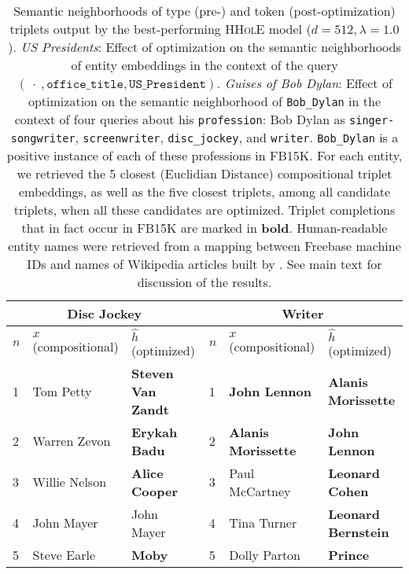 \documentclass[a4paper,10pt]{article}
\begin{document}
\begin{table*}
\begin{tabular}{lll | lll}
 \\
 \multicolumn{3}{c}{\small \textbf{Disc Jockey} } & \multicolumn{3}{c}{\small \textbf{Writer} }  \\ \hline
 \multicolumn{1}{l}{\small $n$} & \multicolumn{1}{l}{\small \textbf{$x$} (compositional)} & \multicolumn{1}{l|}{\small \textbf{$\hat{h}$} (optimized)} & \multicolumn{1}{l}{\small $n$} & \multicolumn{1}{l}{\small \textbf{$x$} (compositional)} & \multicolumn{1}{l}{\small \textbf{$\hat{h}$} (optimized)} \\ \hline 
 {\scriptsize 1 } & { \scriptsize Tom Petty} & { \scriptsize \textbf{Steven Van Zandt} } &  {\scriptsize 1 } & { \scriptsize \textbf{John Lennon} } & { \scriptsize \textbf{Alanis Morissette} } \\
 {\scriptsize 2 } & { \scriptsize Warren Zevon } & { \scriptsize \textbf{Erykah Badu} }&  {\scriptsize 2 } & { \scriptsize \textbf{Alanis Morissette} } & { \scriptsize \textbf{John Lennon}}\\ 
 {\scriptsize 3 } & { \scriptsize Willie Nelson } & { \scriptsize \textbf{Alice Cooper} } &  {\scriptsize 3 } & { \scriptsize Paul McCartney } & { \scriptsize \textbf{Leonard Cohen} }\\ 
 {\scriptsize 4 } & { \scriptsize John Mayer } & { \scriptsize John Mayer} &  {\scriptsize 4 } & { \scriptsize Tina Turner } & { \scriptsize \textbf{Leonard Bernstein}}\\ 
 {\scriptsize 5 } & { \scriptsize Steve Earle } & { \scriptsize \textbf{Moby} } &  {\scriptsize 5 } & { \scriptsize Dolly Parton } & { \scriptsize \textbf{Prince} }\\ \hline  
 \end{tabular} 
 \caption{Semantic neighborhoods of type (pre-) and token (post-optimization) triplets output by the best-performing \textsc{HHolE} model ($d = 512, \lambda = 1.0$). \emph{US Presidents}: Effect of optimization on the semantic neighborhoods of entity embeddings in the context of the query $(\ \cdot\ , \mathtt{office\_title}, \mathtt{US\_{}President})$. \emph{Guises of Bob Dylan}: Effect of optimization on the semantic neighborhood of \texttt{Bob\_{}Dylan} in the context of four queries about his \texttt{profession}: Bob Dylan as \texttt{singer-songwriter}, \texttt{screenwriter}, \texttt{disc\_{}jockey}, and \texttt{writer}. \texttt{Bob\_{}Dylan} is a positive instance of each of these professions in FB15K. For each entity, we retrieved the 5 closest (Euclidian Distance) compositional triplet embeddings, as well as the five closest triplets, among all candidate triplets, when all these candidates are optimized.  
Triplet completions that in fact occur in FB15K are marked in \textbf{bold}. Human-readable entity names were retrieved from a mapping between Freebase machine IDs and names of Wikipedia articles built by \citet{ling2012ner}. See main text for discussion of the results.
} \label{table_sem_neighborhoods}
 \end{table*} 
\end{document}
